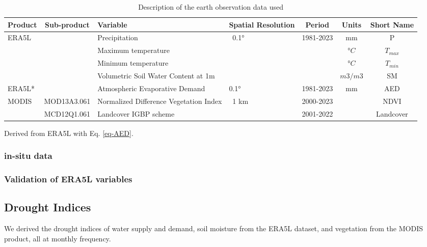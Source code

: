 \documentclass[
  authoryear,
  preprint,
  3p,
  onecolumn]{elsarticle}
\begin{document}
\begin{table}[!ht]
\caption{Description of the earth observation data used }
\label{tab-desEOD}
\small
\centering
\begin{tabular}{p{}cp{}p{}ccc}
\hline
\multirow{1}{*}{\centering Product} & Sub-product & Variable & Spatial Resolution  & Period & Units & Short Name \\ 
\hline
\multirow{4}{*}{ERA5L} & ~ & Precipitation & \multirow{4}{*}{~0.1°} & \multirow{4}{*}{1981-2023} & mm & P \\ 
         &  & Maximum temperature & ~ & & $°C$ & $T_{max}$ \\ 
         &  & Minimum temperature & ~ & & $°C$ & $T_{min}$ \\ 
         &  & Volumetric Soil Water Content at 1m & ~ & & $m3/m3$ & SM \\ 
ERA5L* & & Atmospheric Evaporative Demand & 0.1° & 1981-2023 & mm & AED \\
        \multirow{2}{*}{MODIS} & MOD13A3.061 & Normalized Difference Vegetation Index & \multirow{2}{*}{~1 km} & 2000-2023 & ~ & NDVI \\ 
         & MCD12Q1.061 & Landcover IGBP scheme & & 2001-2022 & ~ & Landcover \\ 
\hline
\end{tabular}
{\raggedright *Derived from ERA5L with Eq. \ref{eq-AED}. \par}
\end{table}

\hypertarget{in-situ-data}{%
\subsubsection{in-situ data}\label{in-situ-data}}

\hypertarget{validation-of-era5l-variables}{%
\subsubsection{Validation of ERA5L
variables}\label{validation-of-era5l-variables}}

\hypertarget{drought-indices}{%
\subsection{Drought Indices}\label{drought-indices}}

We derived the drought indices of water supply and demand, soil moisture
from the ERA5L dataset, and vegetation from the MODIS product, all at
monthly frequency.
\end{document}
